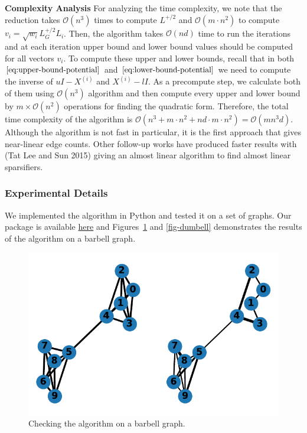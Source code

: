 \documentclass[
  letterpaper,
  DIV=11,
  numbers=noendperiod]{scrartcl}
\theoremstyle{plain}
\theoremstyle{plain}
\theoremstyle{plain}
\theoremstyle{definition}
\theoremstyle{plain}
\theoremstyle{remark}
\begin{document}
\textbf{Complexity Analysis} For analyzing the time complexity, we note
that the reduction takes \(\mathcal{O}(n^3)\) times to compute
\(L^{+/2}\) and \(\mathcal{O}(m \cdot n^2)\) to compute
\(v_i = \sqrt{w_i} L_G^{+/2} L_i\). Then, the algorithm takes
\(\mathcal{O}(nd)\) time to run the iterations and at each iteration
upper bound and lower bound values should be computed for all vectors
\(v_i\). To compute these upper and lower bounds, recall that in both
\(\eqref{eq:upper-bound-potential}\) and
\(\eqref{eq:lower-bound-potential}\) we need to compute the inverse of
\(uI - X^{(i)}\) and \(X^{(i)} - l I\). As a precompute step, we
calculate both of them using \(\mathcal{O}(n^3)\) algorithm and then
compute every upper and lower bound by \(m \times \mathcal{O}(n^2)\)
operations for finding the quadratic form. Therefore, the total time
complexity of the algorithm is
\(\mathcal{O}(n^3 + m \cdot n^2 + nd \cdot m \cdot n^2) = \mathcal{O}(m n^3 d)\).
Although the algorithm is not fast in particular, it is the first
approach that gives near-linear edge counts. Other follow-up works have
produced faster results with (Tat Lee and Sun 2015) giving an almost
linear algorithm to find almost linear sparsifiers.

\hypertarget{experimental-details}{%
\subsubsection{Experimental Details}\label{experimental-details}}

We implemented the algorithm in Python and tested it on a set of graphs.
Our package is available
\href{https://github.com/HamidrezaKmK/twice-ramanujan-sparsifiers}{here}
and Figures~\ref{fig-barbell} and \ref{fig-dumbell} demonstrates the results of the algorithm
on a barbell graph.


\begin{figure}[H]

{\centering \includegraphics{index_files/figure-pdf/fig-barbell-output-1.pdf}

}

\caption{Checking the algorithm on a barbell graph.}

\label{fig-barbell}
\end{figure}
\end{document}

